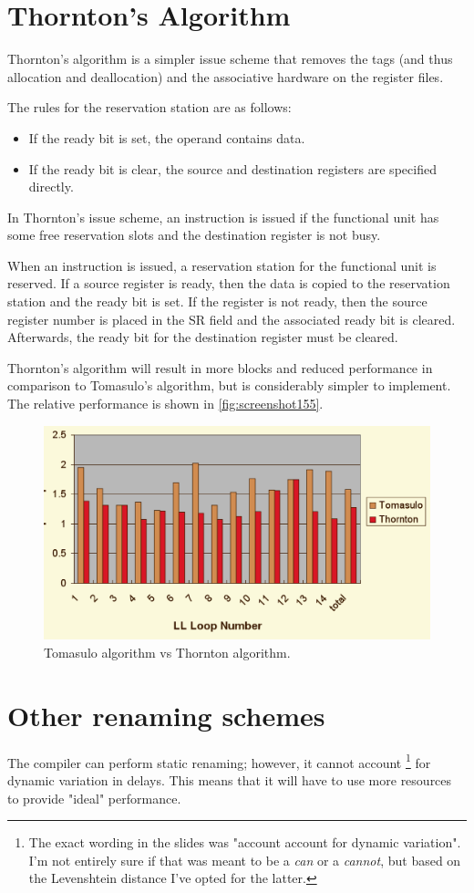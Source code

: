 \section{Thornton's Algorithm}
Thornton's algorithm is a simpler issue scheme that removes the tags (and thus allocation and deallocation) and the associative hardware on the register files.

The rules for the reservation station are as follows: \begin{itemize}
\item If the ready bit is set, the operand contains data.
\item If the ready bit is clear, the source and destination registers are specified directly.
\end{itemize}

In Thornton's issue scheme, an instruction is issued if the functional unit has some free reservation slots and the destination register is not busy.

When an instruction is issued, a reservation station for the functional unit is reserved. If a source register is ready, then the data is copied to the reservation station and the ready bit is set. If the register is not ready, then the source register number is placed in the SR field and the associated ready bit is cleared. Afterwards, the ready bit for the destination register must be cleared.

Thornton's algorithm will result in more blocks and reduced performance in comparison to Tomasulo's algorithm, but is considerably simpler to implement. The relative performance is shown in \autoref{fig:screenshot155}.

\begin{figure}
\centering
\includegraphics[width=0.7\linewidth]{screenshot155}
\caption{Tomasulo algorithm vs Thornton algorithm.}
\label{fig:screenshot155}
\end{figure}

\section{Other renaming schemes}
The compiler can perform static renaming; however, it cannot account \footnote{The exact wording in the slides was "account account for dynamic variation". I'm not entirely sure if that was meant to be a \textit{can} or a \textit{cannot}, but based on the Levenshtein distance I've opted for the latter.} for dynamic variation in delays. This means that it will have to use more resources to provide "ideal" performance.

